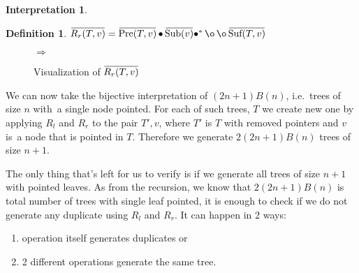 \documentclass[final]{article}
\theoremstyle{definition}
\newtheorem{definition}{Definition}[subsection]
\theoremstyle{definition}
\newtheorem{interpretation}{Interpretation}[subsection]
\theoremstyle{remark}
\newcommand{\ols}[1]{\mskip.5\thinmuskip\overline{\mskip-.5\thinmuskip {#1} \mskip-.5\thinmuskip}\mskip.5\thinmuskip} %
\newcommand{\enc}[1]{\ensuremath{\ols{#1}}}
\newcommand{\pointed}[1]{\ensuremath{{#1}^*}}
\DeclareMathOperator{\tSub}{\text{Sub}}
\DeclareMathOperator{\tPre}{\text{Pre}}
\DeclareMathOperator{\tSuf}{\text{Suf}}
\DeclareMathOperator{\n}{\bullet}
\DeclareMathOperator{\no}{\o}
\begin{document}
\begin{interpretation}
\begin{definition}
    \(\enc{R_r(T, v)} = \enc{\tPre(T, v)} \n \enc{\tSub(v)} \pointed{\n} \no \no \enc{\tSuf(T, v)} \)
\end{definition}

\begin{figure}[H]
    \centering
    \begin{minipage}{.25\textwidth}\end{minipage}%
    \(\Rightarrow\)
    \begin{minipage}{.4\textwidth}\end{minipage}%
    \caption{Visualization of \(\enc{R_r(T, v)}\)}
    \label{fig:remy_right}
\end{figure}

We can now take the bijective interpretation of \((2n + 1) B(n)\), i.e.~trees of size \(n\) with~a single node pointed. For each of such trees, \(T\) we create new one by applying \(R_l\) and \(R_r\) to the pair \(T', v\), where \(T'\) is \(T\) with removed pointers and \(v\) is~a node that is pointed in \(T\). Therefore we generate \(2(2n + 1) B(n)\) trees of size \(n + 1\).

The only thing that's left for us to verify is if we generate all trees of size \(n + 1\) with pointed leaves. As from the recursion, we know that \(2 (2n + 1) B(n)\) is total number of trees with single leaf pointed, it is enough to check if we do not generate any duplicate using \(R_l\) and \(R_r\). It can happen in 2 ways:
\begin{enumerate}
    \item operation itself generates duplicates or
    \item 2 different operations generate the same tree.
\end{enumerate}


\end{interpretation}
\end{document}
